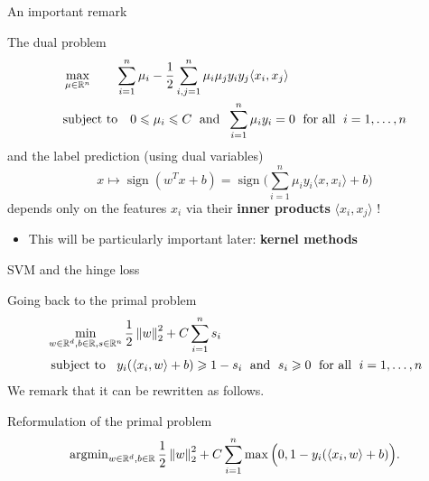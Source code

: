 \documentclass[xcolor={usenames,dvipsnames}]{beamer}
\begin{document}
  \begin{frame}{An important remark}

  The dual problem
  \begin{align*}
      &\max_{\mu \in \mathbb{R}^n} \quad \quad \sum_{i=1}^n \mu_i - \frac 12 \sum_{i, j=1}^n \mu_i \mu_j y_i y_j \langle {x_i, x_j}  \rangle \\
    &\text{subject to} \quad 0 \leqslant \mu_i \leqslant C \; \text{ and } \; 
    \sum_{i=1}^n \mu_i y_i  = 0 \; \text{ for all } \; i=1, \ldots, n
  \end{align*}
  and the label prediction (using dual variables)
  \begin{equation*}
    x \mapsto \mathop{sign}(w^T x + b) = \mathop{sign}\Big(  \sum_{i=1}^n \mu_i y_i 
    \langle {x, x_i} \rangle  + b \Big)
  \end{equation*}
  depends only on the features $x_i$ via their \textbf{inner products} $\langle {x_i, x_j} \rangle $ !
  \begin{itemize}
    \item This will be particularly important later: \textbf{kernel methods}
  \end{itemize}
\end{frame}



 \begin{frame}{SVM and the hinge loss} 

  Going back to the primal problem
  \begin{align*}
    &\min_{w \in \mathbb{R}^d, b \in \mathbb{R}, s \in \mathbb{R}^n} \frac 12 \left\| w \right\|_2^2 
    + C \sum_{i=1}^n s_i \\
    &\text{ subject to } \;\;  y_i (\langle {x_i, w} \rangle + b) \geqslant 1 - s_i \; 
    \text{ and } \; s_i \geqslant 0 \; \text{ for all }  \;i=1, \ldots, n
  \end{align*}
\pause
  \medskip
  We remark that it can be rewritten as follows.
  \begin{block}{Reformulation of the primal problem}
  \begin{equation*}
    \operatorname{argmin}_{w \in \mathbb{R}^d, b \in \mathbb{R}} \frac 12 \left\| w \right\|_2^2 + C \sum_{i=1}^n 
    \max\Big(0, 1 - y_i (\langle {x_i, w} \rangle + b) \Big).
  \end{equation*}
  \end{block}
\end{frame}
\end{document}
